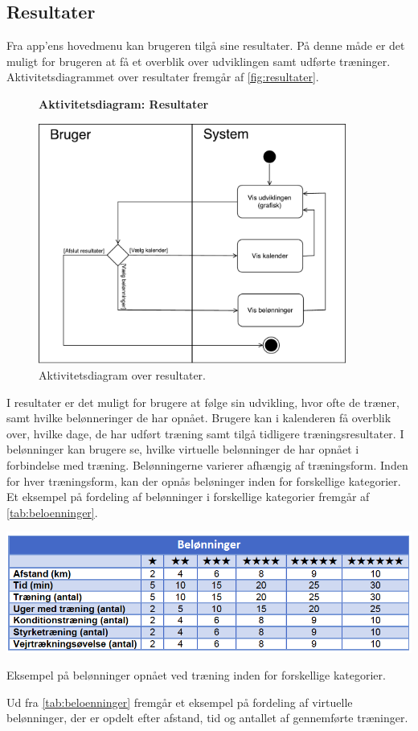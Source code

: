 \subsection*{Resultater}
Fra app'ens hovedmenu kan brugeren tilgå sine resultater. På denne måde er det muligt for brugeren at få et overblik over udviklingen samt udførte træninger.
Aktivitetsdiagrammet over resultater fremgår af \autoref{fig:resultater}.

\begin{figure} [H]
\centering
\textbf{Aktivitetsdiagram: Resultater}\par\medskip
\includegraphics[width=0.9\textwidth]{figures/aktivitetsdiagram/Resultater}
\caption{Aktivitetsdiagram over resultater.}
\label{fig:resultater}
\end{figure}

\noindent
I resultater er det muligt for brugere at følge sin udvikling, hvor ofte de træner, samt hvilke belønneringer de har opnået. 
Brugere kan i kalenderen få overblik over, hvilke dage, de har udført træning samt tilgå tidligere træningsresultater. I belønninger kan brugere se, hvilke virtuelle belønninger de har opnået i forbindelse med træning. Belønningerne varierer afhængig af træningsform. Inden for hver træningsform, kan der opnås beløninger inden for forskellige kategorier. Et eksempel på fordeling af belønninger i forskellige kategorier fremgår af \autoref{tab:beloenninger}.

\begin{table} [H]
\centering
\includegraphics[width=1\textwidth]{figures/aktivitetsdiagram/beloeninnger}
\caption{Eksempel på belønninger opnået ved træning inden for forskellige kategorier.}
\label{tab:beloenninger}
\end{table}

\noindent
Ud fra \autoref{tab:beloenninger} fremgår et eksempel på fordeling af virtuelle belønninger, der er opdelt efter afstand, tid og antallet af gennemførte træninger. 